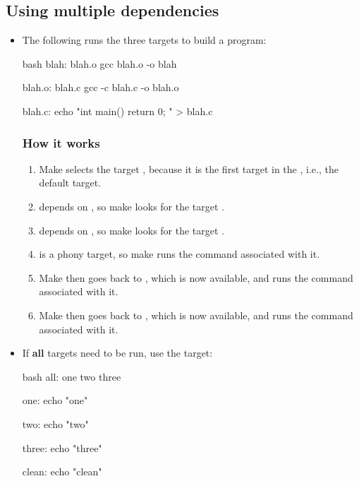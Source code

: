 \subsection{Using multiple dependencies}
\begin{itemize}
    \item The following  runs the three targets to build a program:
    \begin{mintedbox}{bash}
blah: blah.o
    gcc blah.o -o blah

blah.o: blah.c
    gcc -c blah.c -o blah.o

blah.c:
    echo "int main() { return 0; }" > blah.c
    \end{mintedbox}
    \subsubsection{How it works}
    \begin{enumerate}
        \item Make selects the target , because it is the first target in the
        , i.e., the default target.
        \item {} depends on , so make looks for the
        target .
        \item {} depends on , so make looks for the target
        .
        \item {} is a phony target, so make runs the command associated with it.
        \item Make then goes back to , which is now available, and runs the command
        associated with it.
        \item Make then goes back to , which is now available, and runs the command
        associated with it.
    \end{enumerate}
    \item If \textbf{all} targets need to be run, use the  target:
    \begin{mintedbox}{bash}
all: one two three

one:
    echo "one"

two:
    echo "two"

three:
    echo "three"

clean:
    echo "clean"
    \end{mintedbox}
\end{itemize}

